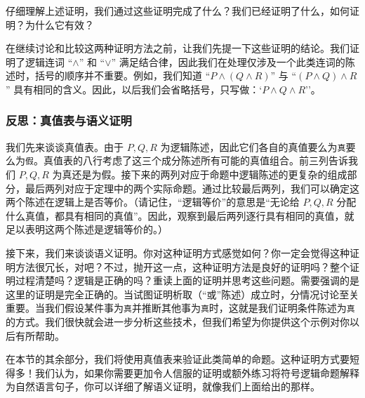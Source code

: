 仔细理解上述证明，我们通过这些证明完成了什么？我们已经证明了什么，如何证明？为什么它有效？

在继续讨论和比较这两种证明方法之前，让我们先提一下这些证明的结论。我们证明了逻辑连词 ``$\land$'' 和 ``$\lor$'' 满足结合律，因此我们在处理仅涉及一个此类连词的陈述时，括号的顺序并不重要。例如，我们知道 ``$P \land (Q \land R)$'' 与 ``$(P \land Q) \land R$'' 具有相同的含义。因此，以后我们会省略括号，只写做：`$P \land Q \land R$''。

\subsubsection*{反思：真值表与语义证明}

我们先来谈谈真值表。由于 $P,Q,R$ 为逻辑陈述，因此它们各自的真值要么为\verb|真|要么为\verb|假|。真值表的八行考虑了这三个成分陈述所有可能的真值组合。前三列告诉我们 $P,Q,R$ 为真还是为假。接下来的两列对应于命题中逻辑陈述的更复杂的组成部分，最后两列对应于定理中的两个实际命题。通过比较最后两列，我们可以确定这两个陈述在逻辑上是否等价。（请记住，``逻辑等价''的意思是``无论给 $P, Q, R$ 分配什么真值，都具有相同的真值''。因此，观察到最后两列逐行具有相同的真值，就足以表明这两个陈述是逻辑等价的。）

接下来，我们来谈谈语义证明。你对这种证明方式感觉如何？你一定会觉得这种证明方法很冗长，对吧？不过，抛开这一点，这种证明方法是良好的证明吗？整个证明过程清楚吗？逻辑是正确的吗？重读上面的证明并思考这些问题。需要强调的是这里的证明是完全正确的。当试图证明析取（``或''陈述）成立时，分情况讨论至关重要。当我们假设某件事为\verb|真|并推断其他事为\verb|真|时，这就是我们证明条件陈述为\verb|真|的方式。我们很快就会进一步分析这些技术，但我们希望为你提供这个示例对你以后有所帮助。

在本节的其余部分，我们将使用真值表来验证此类简单的命题。这种证明方式要短得多！我们认为，如果你需要更加令人信服的证明或额外练习将符号逻辑命题解释为自然语言句子，你可以详细了解语义证明，就像我们上面给出的那样。
